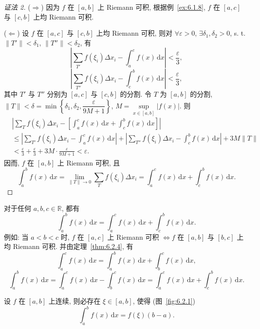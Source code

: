 \begin{proof}[证法 2]
($\Rightarrow$) 因为 $f$ 在 $[a,b]$ 上 Riemann 可积, 根据例~\ref{ex:6.1.8}, $f$ 在 $[a,c]$ 与 $[c,b]$ 上均 Riemann 可积.

($\Leftarrow$) 设 $f$ 在 $[a,c]$ 与 $[c,b]$ 上均 Riemann 可积, 则对 $\forall\varepsilon>0$, $\exists\delta_{1},\delta_{2}>0$, s. t. $\|T'\|<\delta_{1}$, $\|T''\|<\delta_{2}$, 有
\[
\left|\sum_{T'}f(\xi_{i})\Delta x_{i}-\int_{a}^{c}f(x)\,\mathrm{d}x\right|<\frac{\varepsilon}{3},
\]
\[
\left|\sum_{T''}f(\xi_{i})\Delta x_{i}-\int_{c}^{b}f(x)\,\mathrm{d}x\right|<\frac{\varepsilon}{3},
\]
其中 $T'$ 与 $T''$ 分别为 $[a,c]$ 与 $[c,b]$ 的分割. 令 $T$ 为 $[a,b]$ 的分割,\linebreak[4]$\|T\|<\delta=\min\left\{\delta_{1},\delta_{2},\dfrac{\varepsilon}{9M+1}\right\}$, $M=\sup\limits_{x\in[a,b]}|f(x)|$. 则
\begin{align*}
&\left|\sum_{T}f(\xi_{i})\Delta x_{i}-\left[\int_{a}^{c}f(x)\,\mathrm{d}x+\int_{c}^{b}f(x)\,\mathrm{d}x\right]\right|\\
&\leqslant\left|\sum_{T'}f(\xi_{i})\Delta x_{i}-\int_{a}^{c}f(x)\,\mathrm{d}x\right|+\left|\sum_{T''}f(\xi_{i})\Delta x_{i}-\int_{c}^{b}f(x)\,\mathrm{d}x\right|+3M\|T\|\\
&<\frac{\varepsilon}{3}+\frac{\varepsilon}{3}+3M\cdot\frac{\varepsilon}{9M+1}<\varepsilon.
\end{align*}
因而, $f$ 在 $[a,b]$ 上 Riemann 可积, 且
\[
\int_{a}^{b}f(x)\,\mathrm{d}x=\lim_{\|T\|\to 0}\sum_{T}f(\xi_{i})\Delta x_{i}=\int_{a}^{c}f(x)\,\mathrm{d}x+\int_{c}^{b}f(x)\,\mathrm{d}x.
\]
\end{proof}

\begin{remark}\label{remark:6.2.1}
对于任何 $a,b,c\in\mathbb{R}$, 都有
\[
\int_{a}^{b}f(x)\,\mathrm{d}x=\int_{a}^{c}f(x)\,\mathrm{d}x+\int_{c}^{b}f(x)\,\mathrm{d}x.
\]
例如: 当 $a<b<c$ 时, $f$ 在 $[a,c]$ 上 Riemann 可积 $\Leftrightarrow f$ 在 $[a,b]$ 与 $[b,c]$ 上均 Riemann 可积. 并由定理~\ref{thm:6.2.4}, 有
\[
\int_{a}^{c}f(x)\,\mathrm{d}x=\int_{a}^{b}f(x)\,\mathrm{d}x+\int_{b}^{c}f(x)\,\mathrm{d}x,
\]
\[
\int_{a}^{b}f(x)\,\mathrm{d}x=\int_{a}^{c}f(x)\,\mathrm{d}x-\int_{b}^{c}f(x)\,\mathrm{d}x=\int_{a}^{c}f(x)\,\mathrm{d}x+\int_{c}^{b}f(x)\,\mathrm{d}x.
\]
\end{remark}

\begin{theorem}[积分第一中值定理]\label{thm:6.2.5}
设 $f$ 在 $[a,b]$ 上连续, 则必存在 $\xi\in[a,b]$, 使得 (图~\ref{fig:6.2.1})
\[
\int_{a}^{b}f(x)\,\mathrm{d}x=f(\xi)(b-a).
\]
\end{theorem}

